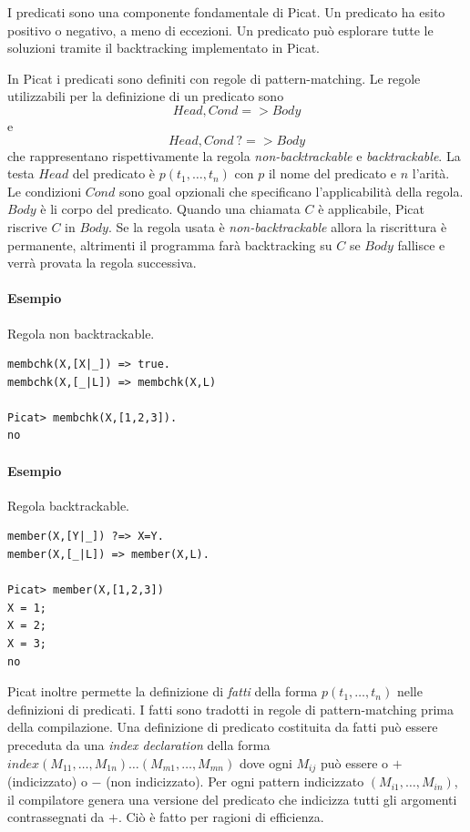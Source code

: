 \documentclass[12pt,a4paper,openright]{book} %
\begin{document}
I predicati sono una componente fondamentale di Picat. Un predicato ha
esito positivo o negativo, a meno di eccezioni. Un predicato può
esplorare tutte le soluzioni tramite il backtracking implementato in
Picat.

In Picat i predicati sono definiti con regole di pattern-matching. Le
regole utilizzabili per la definizione di un predicato sono 
\[ Head, Cond => Body \]
e
\[Head, Cond\ ?=> Body \] che rappresentano
rispettivamente la regola \emph{non-backtrackable} e
\emph{backtrackable}. La testa $Head$ del predicato è $p(t_1, \ldots,
t_n)$ con $p$ il nome del predicato e $n$ l'arità. Le condizioni
$Cond$ sono goal opzionali che specificano l'applicabilità della
regola. $Body$ è li corpo del predicato.  Quando una chiamata $C$ è
applicabile, Picat riscrive $C$ in $Body$. Se la regola usata è
\emph{non-backtrackable} allora la riscrittura è permanente,
altrimenti il programma farà backtracking su $C$ se $Body$ fallisce e
verrà provata la regola successiva.

\paragraph{Esempio} Regola non backtrackable.
\begin{verbatim}
membchk(X,[X|_]) => true.
membchk(X,[_|L]) => membchk(X,L)

Picat> membchk(X,[1,2,3]).
no
\end{verbatim}

\paragraph{Esempio} Regola backtrackable.
\begin{verbatim}
member(X,[Y|_]) ?=> X=Y.
member(X,[_|L]) => member(X,L).

Picat> member(X,[1,2,3])
X = 1;
X = 2;
X = 3;
no
\end{verbatim}

Picat inoltre permette la definizione di \emph{fatti} della forma
$p(t_1, \ldots, t_n)$ nelle definizioni di predicati. I fatti sono
tradotti in regole di pattern-matching prima della compilazione. Una
definizione di predicato costituita da fatti può essere preceduta da
una \emph{index declaration} della forma $index (M_{11}, \ldots,
M_{1n}) \ldots (M_{m1}, \ldots, M_{mn})$ dove ogni $M_{ij}$ può essere
o $+$ (indicizzato) o $-$ (non indicizzato). Per ogni pattern
indicizzato $(M_{i1}, \ldots, M_{in})$, il compilatore genera una
versione del predicato che indicizza tutti gli argomenti
contrassegnati da $+$. Ciò è fatto per ragioni di efficienza.
\end{document}
